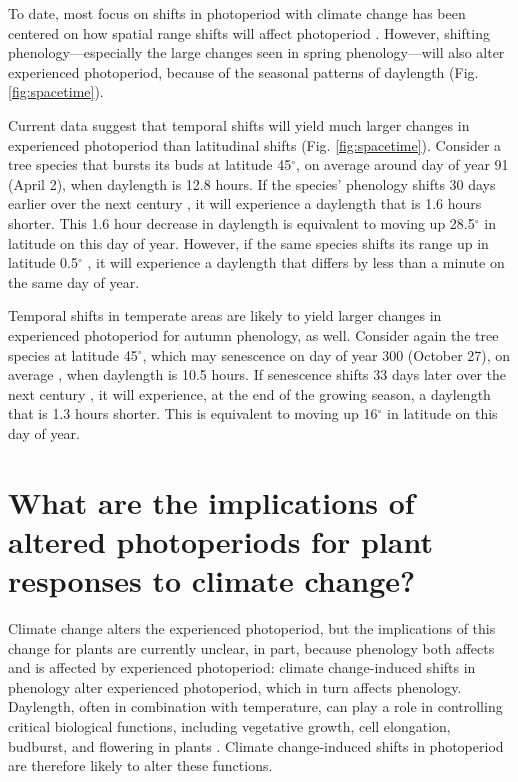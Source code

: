 \documentclass{article}
\begin{document}
\par To date, most focus on shifts in photoperiod with climate change has been centered on how spatial range shifts will affect photoperiod \citep[e.g.,][]{saikkonen2012,way2015}. However, shifting phenology---especially the large changes seen in spring phenology---will also alter experienced photoperiod, because of the seasonal patterns of daylength (Fig. \ref{fig:spacetime}). 

\par Current data suggest that temporal shifts will yield much larger changes in experienced photoperiod than latitudinal shifts (Fig. \ref{fig:spacetime}).
Consider a tree species that bursts its buds at latitude 45$^{\circ}$, on average around day of year 91 (April 2), when daylength is 12.8 hours. If the species' phenology shifts 30 days earlier over the next century \citep[i.e., a rate of ~3 days per decade, as has been observed,][]{parmesan2003}, it will experience a daylength that is 1.6 hours shorter. This 1.6 hour decrease in daylength is equivalent to moving up 28.5$^{\circ}$ in latitude on this day of year. However, if the same species shifts its range up in latitude 0.5$^{\circ}$ \citep[i.e., 60 km over the next century, comparable to observed rates,][]{chen2011,parmesan2003}, it will experience a daylength that differs by less than a minute on the same day of year. 
\par Temporal shifts in temperate areas are likely to yield larger changes in experienced photoperiod for autumn phenology, as well. Consider again the tree species at latitude 45$^{\circ}$, which may senescence on day of year 300 (October 27), on average \citep{gill2015}, when daylength is 10.5 hours. If senescence shifts 33 days later over the next century \citep[i.e., a rate of 3.3 days per decade, as has been observed,][]{gill2015}, it will experience, at the end of the growing season, a daylength that is 1.3 hours shorter. This is equivalent to moving up 16$^{\circ}$ in latitude on this day of year.
\section*{What are the implications of altered photoperiods for plant responses to climate change?}
Climate change alters the experienced photoperiod, but the implications of this change for plants are currently unclear, in part, because phenology both affects and is affected by experienced photoperiod: climate change-induced shifts in phenology alter experienced photoperiod, which in turn affects phenology. Daylength, often in combination with temperature, can play a role in controlling critical biological functions, including vegetative growth, cell elongation, budburst, and flowering in plants \citep{fu2019,Heide:2012aa,Heide:2011aa,Hsu:2011,sidaway2010,mimura2007,Linkosalo:2006aa,erwin1998,Ashby:1962aa}.
Climate change-induced shifts in photoperiod are therefore likely to alter these functions. 
\end{document}
